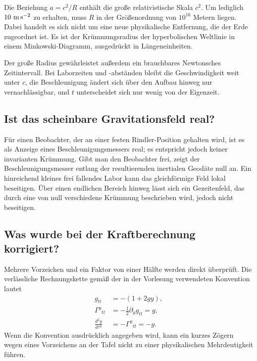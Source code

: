 Die Beziehung \(a=c^2/R\) enthält die große relativistische Skala \(c^2\). Um lediglich \(10\ {\rm m\,s^{-2}}\) zu erhalten, muss \(R\) in der Größenordnung von \(10^{16}\) Metern liegen. Dabei handelt es sich nicht um eine neue physikalische Entfernung, die der Erde zugeordnet ist. Es ist der Krümmungsradius der hyperbolischen Weltlinie in einem Minkowski-Diagramm, ausgedrückt in Längeneinheiten.

Der große Radius gewährleistet außerdem ein brauchbares Newtonsches Zeitintervall. Bei Laborzeiten und -abständen bleibt die Geschwindigkeit weit unter \(c\), die Beschleunigung ändert sich über den Aufbau hinweg nur vernachlässigbar, und \(t\) unterscheidet sich nur wenig von der Eigenzeit.

\subsection{Ist das scheinbare Gravitationsfeld real?}

Für einen Beobachter, der an einer festen Rindler-Position gehalten wird, ist es als Anzeige eines Beschleunigungsmessers real; es entspricht jedoch keiner invarianten Krümmung. Gibt man den Beobachter frei, zeigt der Beschleunigungsmesser entlang der resultierenden inertialen Geodäte null an. Ein hinreichend kleines frei fallendes Labor kann das gleichförmige Feld lokal beseitigen. Über einen endlichen Bereich hinweg lässt sich ein Gezeitenfeld, das durch eine von null verschiedene Krümmung beschrieben wird, jedoch nicht beseitigen.

\subsection{Was wurde bei der Kraftberechnung korrigiert?}

Mehrere Vorzeichen und ein Faktor von einer Hälfte werden direkt überprüft. Die verlässliche Rechnungskette gemäß der in der Vorlesung verwendeten Konvention lautet
\begin{equation}
\begin{aligned}
g_{tt}&=-(1+2gy),\\
\Gamma^y{}_{tt}&=-\frac12\partial_yg_{tt}=g,\\
\frac{d^2y}{d\tau^2}&=-\Gamma^y{}_{tt}=-g.
\end{aligned}
\end{equation}
Wenn die Konvention ausdrücklich angegeben wird, kann ein kurzes Zögern wegen eines Vorzeichens an der Tafel nicht zu einer physikalischen Mehrdeutigkeit führen.

